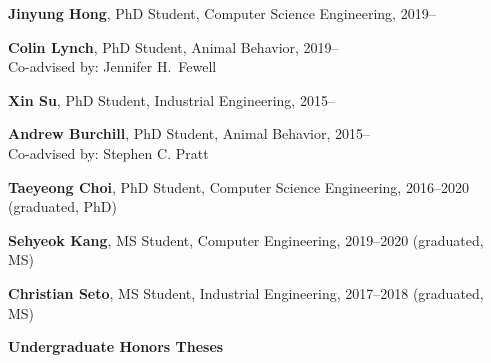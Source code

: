\documentclass[10pt]{article}           %
\newcommand{\blankline}{\quad\pagebreak[3]}
\begin{document}
\begin{cvlist}[loose]

    \item \textbf{Jinyung Hong}, PhD Student, Computer Science
        Engineering, 2019--

    \item \textbf{Colin Lynch}, PhD Student, Animal Behavior, 2019--\\
        Co-advised by: Jennifer H.~Fewell


    \item \textbf{Xin Su}, PhD Student, Industrial Engineering, 2015--

    \item \textbf{Andrew Burchill}, PhD Student, Animal Behavior, 2015--\\
        Co-advised by: Stephen C. Pratt

    \item \textbf{Taeyeong Choi}, PhD Student, Computer Science Engineering, 2016--2020 (graduated, PhD)

    \item \textbf{Sehyeok Kang}, MS Student, Computer Engineering, 2019--2020 (graduated, MS)

    \item \textbf{Christian Seto}, MS Student, Industrial Engineering, 2017--2018 (graduated, MS)
\end{cvlist}

\blankline

\textbf{Undergraduate Honors Theses}
\end{document}
